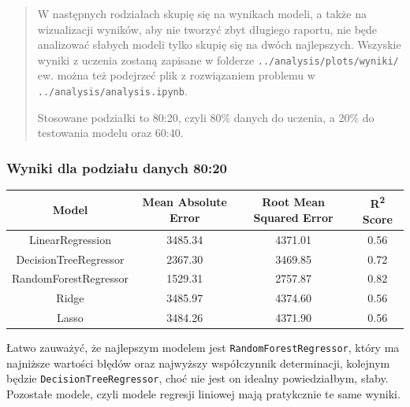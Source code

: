 \documentclass[a4paper]{article}
\begin{document}
\begin{abstract}
    \quad W następnych rodziałach skupię się na wynikach modeli, a także na wizualizacji wyników, aby nie
    tworzyć zbyt długiego raportu, nie będe analizować słabych modeli tylko skupię się na dwóch najlepszych. Wszyskie wyniki z uczenia zostaną zapisane w folderze \texttt{../analysis/plots/wyniki/} ew. można też podejrzeć plik z rozwiązaniem problemu w \texttt{../analysis/analysis.ipynb}.

    \quad Stosowane podziałki to 80:20, czyli 80\% danych do uczenia, a 20\% do testowania modelu oraz 60:40.
\end{abstract}

\subsubsection{Wyniki dla podziału danych 80:20}

\begin{table}[H]
    \centering
    \begin{tabular}{|c|c|c|c|}
        \hline
        \textbf{Model}        & \textbf{Mean Absolute Error} & \textbf{Root Mean Squared Error} & \textbf{R\textsuperscript{2} Score} \\ \hline
        LinearRegression      & 3485.34                      & 4371.01                          & 0.56                                \\ \hline
        DecisionTreeRegressor & 2367.30                      & 3469.85                          & 0.72                                \\ \hline
        RandomForestRegressor & 1529.31                      & 2757.87                          & 0.82                                \\ \hline
        Ridge                 & 3485.97                      & 4374.60                          & 0.56                                \\ \hline
        Lasso                 & 3484.26                      & 4371.90                          & 0.56                                \\ \hline
    \end{tabular}
\end{table}


\quad Łatwo zauważyć, że najlepszym modelem jest \texttt{RandomForestRegressor}, który ma
najniższe wartości błędów oraz najwyższy współczynnik determinacji, kolejnym
będzie \texttt{DecisionTreeRegressor}, choć nie jest on idealny powiedziałbym, słaby.
Pozostałe modele, czyli modele regresji liniowej mają pratykcznie te same wyniki.
\end{document}
